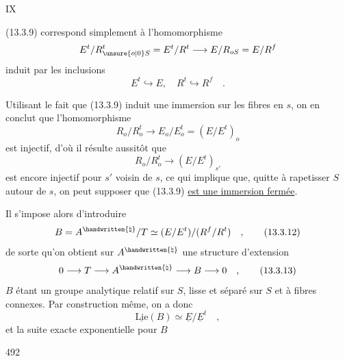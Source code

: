 \hfill IX

(13.3.9) correspond simplement à l'homomorphisme
\[
E^t/R_{\unsure{o|0}S}^t=E^t/R^t\longrightarrow E/R_{oS}=E/R^f
\]
induit par les inclusions
\[
E^t\hookrightarrow E,\quad R^t\hookrightarrow R^f\quad .
\]

Utilisant le fait que (13.3.9) induit une immersion sur les fibres en $s$, on en conclut que l'homomorphisme
\[
R_o/R_o^t\longrightarrow E_o/E_o^t=(E/E^t)_o
\]
est injectif, d'où il résulte aussitôt que
\[
R_o/R_o^t\longrightarrow(E/E^t)_{s'}
\]
est encore injectif pour $s'$ voisin de $s$, ce qui implique que, quitte à rapetisser $S$ autour de $s$, on peut supposer que (13.3.9) \uline{est une immersion fermée}.

Il s'impose alors d'introduire
\[
B=A^{\handwritten{\natural}}/T\simeq(E/E^t)/(R^f/R^t)\quad , \tag*{(13.3.12)}
\]
de sorte qu'on obtient sur $A^{\handwritten{\natural}}$ une structure d'extension
\[
0\longrightarrow T\longrightarrow A^{\handwritten{\natural}}\longrightarrow B\longrightarrow 0\quad , \tag*{(13.3.13)}
\]
$B$ étant un groupe analytique relatif sur $S$, lisse et séparé sur $S$ et à fibres connexes. Par construction même, on a donc
\[
\underline{\mathrm{Lie}}(B)\simeq\underline E/\underline E^t\quad , \tag*{(13.3.14)}
\]
et la suite exacte exponentielle pour $B$

492
